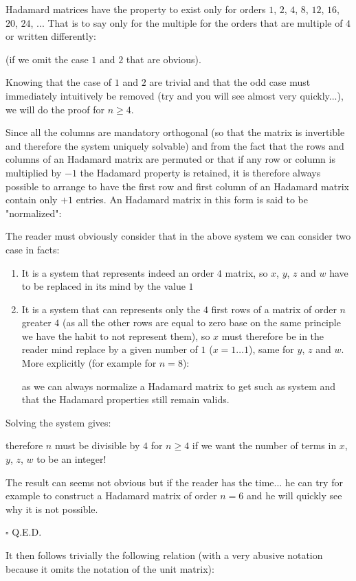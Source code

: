 	\begin{theorem} 
	Hadamard matrices have the property to exist only for orders $1$, $2$, $4$, $8$, $12$, $16$, $20$, $24$, ... That is to say only for the multiple for the orders that are multiple of $4$ or written differently:
	
	 (if we omit the case $1$ and $2$ that are obvious).
	\end{theorem}
	\begin{dem}
	Knowing that the case of $1$ and $2$ are trivial and that the odd case must immediately intuitively be removed (try and you will see almost very quickly...), we will do the proof for $n\geq 4$.
	
	Since all the columns are mandatory orthogonal (so that the matrix is invertible and therefore the system uniquely solvable) and from the fact that the rows and columns of an Hadamard matrix are permuted or that if any row or column is multiplied by $-1$ the Hadamard property is retained, it is therefore always possible to arrange to have the first row and first column of an Hadamard matrix contain only $+1$ entries. An Hadamard matrix in this form is said to be "normalized":
	
	The reader must obviously consider that in the above system we can consider two case in facts:
	\begin{enumerate}
		\item It is a system that represents indeed an order $4$ matrix, so $x$, $y$, $z$ and $w$ have to be replaced in its mind by the value $1$

		\item It is a system that can represents only the $4$ first rows of a matrix of order $n$ greater $4$ (as all the other rows are equal to zero base on the same principle we have the habit to not represent them), so $x$ must therefore be in the reader mind replace by a given number of $1$ ($x=1\ldots 1$), same for $y$, $z$ and $w$. More explicitly (for example for $n=8$):
		
		as we can always normalize a Hadamard matrix to get such as system and that the Hadamard properties still remain valids.
	\end{enumerate}
	Solving the system gives:
	
	therefore $n$ must be divisible by $4$ for $n \geq 4$ if we want the number of terms in $x$, $y$, $z$, $w$ to be an integer!
	
	The result can seems not obvious but if the reader has the time... he can try for example to construct a Hadamard matrix of order $n=6$ and he will quickly see why it is not possible.
	\begin{flushright}
		$\square$  Q.E.D.
	\end{flushright}
	\end{dem}
	It then follows trivially the following relation (with a very abusive notation because it omits the notation of the unit matrix):
	
